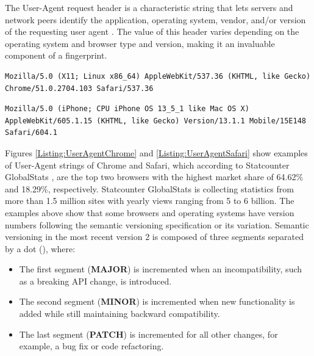 The User-Agent request header is a characteristic string that lets servers and network peers identify the application, operating system, vendor, and/or version of the requesting user agent \cite{MDNHeaderUserAgent}. The value of this header varies depending on the operating system and browser type and version, making it an invaluable component of a fingerprint.

\bigbreak

\begin{lstlisting}[caption={An example of Chrome User-Agent string \cite{MDNHeaderUserAgent}.}, label={Listing:UserAgentChrome}]
Mozilla/5.0 (X11; Linux x86_64) AppleWebKit/537.36 (KHTML, like Gecko) Chrome/51.0.2704.103 Safari/537.36
\end{lstlisting}

\begin{lstlisting}[caption={An example of Safari User-Agent string (mobile version) \cite{MDNHeaderUserAgent}.}, label={Listing:UserAgentSafari}]
Mozilla/5.0 (iPhone; CPU iPhone OS 13_5_1 like Mac OS X) AppleWebKit/605.1.15 (KHTML, like Gecko) Version/13.1.1 Mobile/15E148 Safari/604.1
\end{lstlisting}

\medbreak

Figures \ref{Listing:UserAgentChrome} and \ref{Listing:UserAgentSafari} show examples of User-Agent strings of Chrome and Safari, which according to Statcounter GlobalStats \cite{StatcounterGlobalStats}, are the top two browsers with the highest market share of 64.62\% and 18.29\%, respectively. Statcounter GlobalStats is collecting statistics from more than 1.5 million sites with yearly views ranging from 5 to 6 billion. The examples above show that some browsers and operating systems have version numbers following the semantic versioning specification \cite{SemVerWebsite} or its variation. Semantic versioning in the most recent version 2 is composed of three segments separated by a dot (), where:

\begin{itemize}
	\item The first segment (\textbf{MAJOR}) is incremented when an incompatibility, such as a breaking API change, is introduced.
	\item The second segment (\textbf{MINOR}) is incremented when new functionality is added while still maintaining backward compatibility.
	\item The last segment (\textbf{PATCH}) is incremented for all other changes, for example, a bug fix or code refactoring.
\end{itemize}

